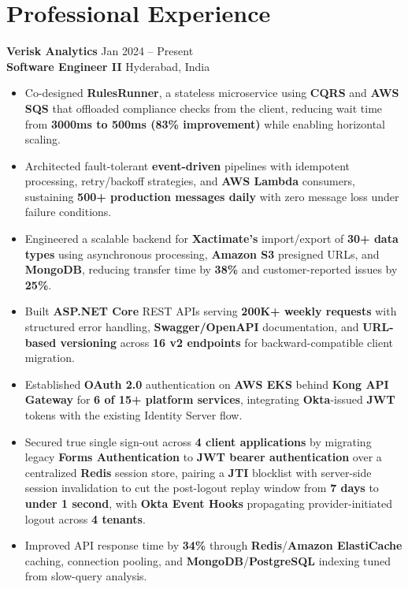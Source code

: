 \documentclass[a4paper,10pt]{article}
\begin{document}
\section*{Professional Experience}

\textbf{Verisk Analytics} \hfill Jan 2024 -- Present \\
\textbf{Software Engineer II} \hfill Hyderabad, India

\begin{itemize}[leftmargin=*]
    \item Co-designed \textbf{RulesRunner}, a stateless microservice using \textbf{CQRS} and \textbf{AWS SQS} that offloaded compliance checks from the client, reducing wait time from \textbf{3000ms to 500ms (83\% improvement)} while enabling horizontal scaling.
    \item Architected fault-tolerant \textbf{event-driven} pipelines with idempotent processing, retry/backoff strategies, and \textbf{AWS Lambda} consumers, sustaining \textbf{500+ production messages daily} with zero message loss under failure conditions.
    \item Engineered a scalable backend for \textbf{Xactimate's} import/export of \textbf{30+ data types} using asynchronous processing, \textbf{Amazon S3} presigned URLs, and \textbf{MongoDB}, reducing transfer time by \textbf{38\%} and customer-reported issues by \textbf{25\%}.
    \item Built \textbf{ASP.NET Core} REST APIs serving \textbf{200K+ weekly requests} with structured error handling, \textbf{Swagger/OpenAPI} documentation, and \textbf{URL-based versioning} across \textbf{16 v2 endpoints} for backward-compatible client migration.
    \item Established \textbf{OAuth 2.0} authentication on \textbf{AWS EKS} behind \textbf{Kong API Gateway} for \textbf{6 of 15+ platform services}, integrating \textbf{Okta}-issued \textbf{JWT} tokens with the existing Identity Server flow.
    \item Secured true single sign-out across \textbf{4 client applications} by migrating legacy \textbf{Forms Authentication} to \textbf{JWT bearer authentication} over a centralized \textbf{Redis} session store, pairing a \textbf{JTI} blocklist with server-side session invalidation to cut the post-logout replay window from \textbf{7 days} to \textbf{under 1 second}, with \textbf{Okta Event Hooks} propagating provider-initiated logout across \textbf{4 tenants}.
    \item Improved API response time by \textbf{34\%} through \textbf{Redis}/\textbf{Amazon ElastiCache} caching, connection pooling, and \textbf{MongoDB}/\textbf{PostgreSQL} indexing tuned from slow-query analysis.

\end{itemize}
\end{document}
